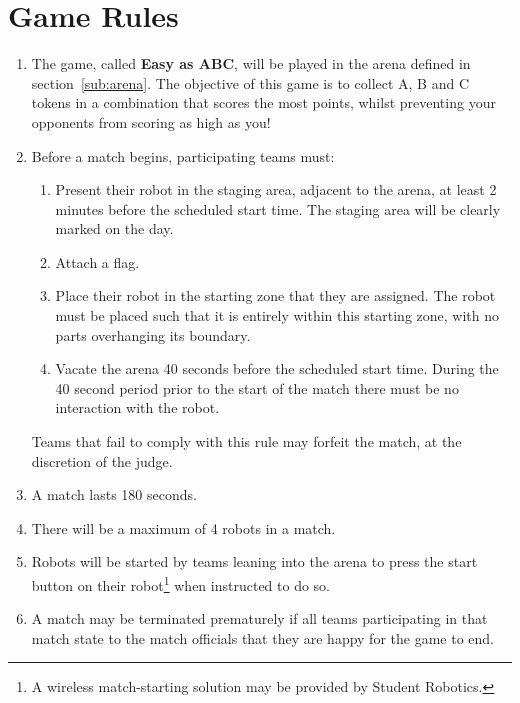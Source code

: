 \section {Game Rules}
\label{game-rules}

\begin{enumerate}
\item The game, called \textbf{Easy as ABC}, will be played in the arena defined in section~\ref{sub:arena}.  The objective of this game is to collect A, B and C tokens in a combination that scores the most points, whilst preventing your opponents from scoring as high as you!

\item Before a match begins, participating teams must:
\begin {enumerate}
  \item Present their robot in the staging area, adjacent to the arena, at least 2 minutes before the scheduled start time.
        The staging area will be clearly marked on the day.

  \item Attach a flag.

  \item Place their robot in the starting zone that they are assigned.
        The robot must be placed such that it is entirely within this starting zone, with no parts overhanging its boundary.

  \item Vacate the arena 40 seconds before the scheduled start time.
        During the 40 second period prior to the start of the match there must be no interaction with the robot.
\end{enumerate}
  Teams that fail to comply with this rule may forfeit the match, at the discretion of the judge.

\item A match lasts 180 seconds.

\item There will be a maximum of 4 robots in a match.

\item Robots will be started by teams leaning into the arena to press the start button on their robot\footnote{A wireless match-starting solution may be provided by Student Robotics.} when instructed to do so.

\item A match may be terminated prematurely if all teams participating in that match state to the match officials that they are happy for the game to end.


\end{enumerate}
